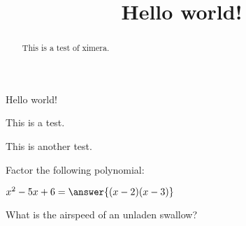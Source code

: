 \documentclass{ximera}
\begin{document}
\title{Hello world!}

\begin{abstract}
This is a test of ximera.
\end{abstract}

\maketitle

Hello world!

This is a test.

This is another test.

\begin{exercise}
Factor the following polynomial:

$x^2 - 5x + 6 = \answer{(x-2)(x-3)}$
\end{exercise}

\begin{exercise}
What is the airspeed of an unladen swallow? 
\end{exercise}
\end{document}
